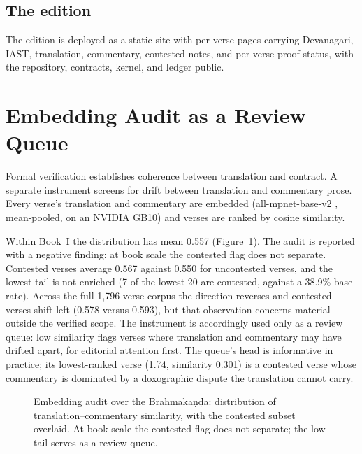 \documentclass[11pt]{article}
\begin{document}
\subsection{The edition}
The edition is deployed as a static site with per-verse pages carrying
Devanagari, IAST, translation, commentary, contested notes, and per-verse
proof status, with the repository, contracts, kernel, and ledger public.

\section{Embedding Audit as a Review Queue}
\label{sec:audit}

Formal verification establishes coherence between translation and contract.
A separate instrument screens for drift between translation and commentary
prose. Every verse's translation and commentary are embedded
(all-mpnet-base-v2 \citep{reimers2019sbert}, mean-pooled, on an NVIDIA
GB10) and verses are ranked by cosine similarity.

Within Book~I the distribution has mean 0.557
(Figure~\ref{fig:audit}). The audit is reported with a negative finding: at
book scale the contested flag does not separate. Contested verses average
0.567 against 0.550 for uncontested verses, and the lowest tail is not
enriched (7 of the lowest 20 are contested, against a 38.9\% base rate).
Across the full 1,796-verse corpus the direction reverses and contested
verses shift left (0.578 versus 0.593), but that observation concerns
material outside the verified scope. The instrument is accordingly used
only as a review queue: low similarity flags verses where translation and
commentary may have drifted apart, for editorial attention first. The
queue's head is informative in practice; its lowest-ranked verse (1.74,
similarity 0.301) is a contested verse whose commentary is dominated by a
doxographic dispute the translation cannot carry.

\begin{figure}[t]
\centering
{}
\caption{Embedding audit over the Brahmak\={a}\d{n}\d{d}a: distribution of
translation--commentary similarity, with the contested subset overlaid. At
book scale the contested flag does not separate; the low tail serves as a
review queue.}
\label{fig:audit}
\end{figure}
\end{document}
